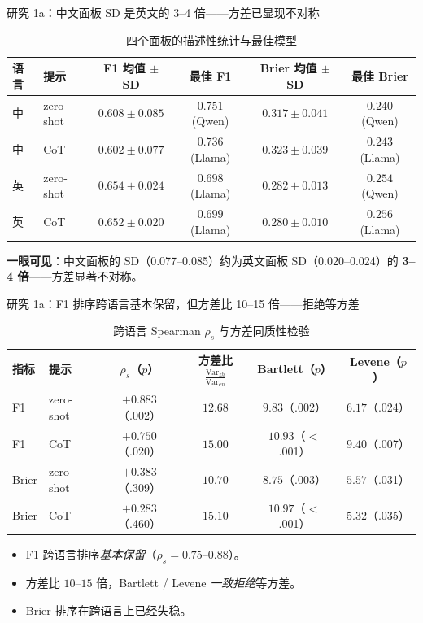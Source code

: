 \documentclass[aspectratio=169,professionalfonts]{beamer}
\begin{document}
\begin{frame}{研究 1a：中文面板 SD 是英文的 3--4 倍——方差已显现不对称}
  \footnotesize
  \setlength{\tabcolsep}{4pt}
  \begin{table}
    \centering
    \caption{\small 四个面板的描述性统计与最佳模型}
    \begin{tabular}{llcccc}
      \toprule
      语言 & 提示 & F1 均值 $\pm$ SD & 最佳 F1 & Brier 均值 $\pm$ SD & 最佳 Brier \\
      \midrule
      中 & zero-shot & $0.608 \pm 0.085$ & $0.751$ (Qwen)  & $0.317 \pm 0.041$ & $0.240$ (Qwen) \\
      中 & CoT       & $0.602 \pm 0.077$ & $0.736$ (Llama) & $0.323 \pm 0.039$ & $0.243$ (Llama) \\
      英 & zero-shot & $0.654 \pm 0.024$ & $0.698$ (Llama) & $0.282 \pm 0.013$ & $0.254$ (Qwen) \\
      英 & CoT       & $0.652 \pm 0.020$ & $0.699$ (Llama) & $0.280 \pm 0.010$ & $0.256$ (Llama) \\
      \bottomrule
    \end{tabular}
  \end{table}

  \vspace{0.2em}
  \textbf{一眼可见}：中文面板的 SD（0.077--0.085）约为英文面板 SD（0.020--0.024）的 \textbf{3--4 倍}——方差显著不对称。
\end{frame}

\begin{frame}{研究 1a：F1 排序跨语言基本保留，但方差比 10--15 倍——拒绝等方差}
  \footnotesize
  \setlength{\tabcolsep}{4pt}
  \begin{table}
    \centering
    \caption{\small 跨语言 Spearman $\rho_s$ 与方差同质性检验}
    \begin{tabular}{llcccc}
      \toprule
      指标 & 提示 & $\rho_s$（$p$） & 方差比 $\frac{\text{Var}_{zh}}{\text{Var}_{en}}$ & Bartlett（$p$） & Levene（$p$） \\
      \midrule
      F1    & zero-shot & $+0.883$（.002） & $12.68$ & $9.83$（.002） & $6.17$（.024） \\
      F1    & CoT       & $+0.750$（.020） & $15.00$ & $10.93$（$<$.001） & $9.40$（.007） \\
      Brier & zero-shot & $+0.383$（.309） & $10.70$ & $8.75$（.003） & $5.57$（.031） \\
      Brier & CoT       & $+0.283$（.460） & $15.10$ & $10.97$（$<$.001） & $5.32$（.035） \\
      \bottomrule
    \end{tabular}
  \end{table}

  \begin{itemize}
    \small
    \item F1 跨语言排序\emph{基本保留}（$\rho_s = 0.75$--$0.88$）。
    \item 方差比 $10$--$15$ 倍，Bartlett / Levene \emph{一致拒绝}等方差。
    \item Brier 排序在跨语言上已经失稳。
  \end{itemize}
\end{frame}
\end{document}
